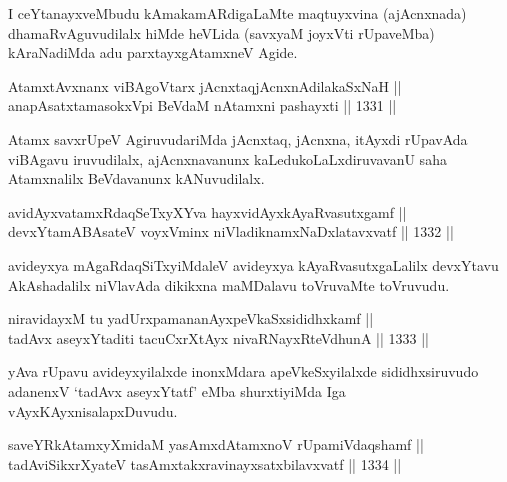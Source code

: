 \begin{artha}
I ceYtanayxveMbudu kAmakamARdigaLaMte maqtuyxvina (ajAcnxnada) dhamaRvAguvudilalx hiMde heVLida (savxyaM joyxVti rUpaveMba) kAraNadiMda adu parxtayxgAtamxneV Agide.
\end{artha}


\begin{shl}
AtamxtAvxnanx viBAgoV\s tarx jAcnxtaqjAcnxnAdilakaSxNaH ||  \\
anapAsatxtamasokxV\s pi BeVdaM nA\s \s tamxni pashayxti \hfill || 1331 ||  
\end{shl}

\begin{artha}
Atamx savxrUpeV AgiruvudariMda jAcnxtaq, jAcnxna, itAyxdi rUpavAda viBAgavu iruvudilalx, ajAcnxnavanunx kaLedukoLaLxdiruvavanU saha Atamxnalilx BeVdavanunx kANuvudilalx.
\end{artha}


\begin{shl}
avidAyxvatamxRdaqSeTxyXYva hayxvidAyxkAyaRvasutxgamf ||  \\
devxYtamABAsateV voyxVminx niVladiknamxNaDxlatavxvatf \hfill || 1332 ||  
\end{shl}

\begin{artha}
avideyxya mAgaRdaqSiTxyiMdaleV avideyxya kAyaRvasutxgaLalilx devxYtavu AkAshadalilx niVlavAda dikikxna maMDalavu toVruvaMte toVruvudu.
\end{artha}


\begin{shl}
niravidayxM tu yadUrxpamananAyxpeVkaSxsididhxkamf || \\
tadAvx aseyxYtaditi tacuCxrXtAyx nivaRNayxRteV\s dhunA \hfill || 1333 ||  
\end{shl}

\begin{artha}
yAva rUpavu avideyxyilalxde inonxMdara apeVkeSxyilalxde sididhxsiruvudo adanenxV `tadAvx aseyxYtatf' eMba shurxtiyiMda Iga vAyxKAyxnisalapxDuvudu.
\end{artha}

\begin{shl}
saveYRkAtamxyXmidaM yasAmxdAtamxnoV rUpamiVdaqshamf || \\
tadAviSikxrXyateV tasAmxtakxravinayxsatxbilavxvatf \hfill || 1334 ||  
\end{shl}

